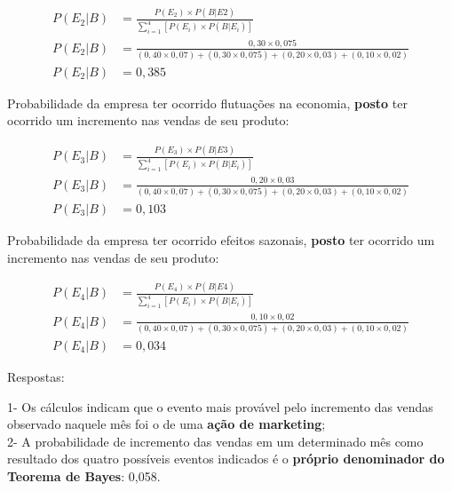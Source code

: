 \documentclass[
]{book}
\begin{document}
\hfill\break

\begin{align*}
P(E_{2}|B) &  = \frac{ P(E_{2}) \times P(B|E{2})   }{  \sum _{i=1}^{4}\left[P\left({E}_{i}\right)\times P\left(B|{E}_{i}\right)\right]  }  \\
P(E_{2}|B) & = \frac{0,30 \times 0,075} { (0,40 \times 0,07) + (0,30 \times 0,075) +(0,20 \times 0,03) +(0,10 \times 0,02) } \\
P(E_{2}|B) & = 0,385 
\end{align*}

\hfill\break

Probabilidade da empresa ter ocorrido flutuações na economia, \textbf{posto} ter ocorrido um incremento nas vendas de seu produto:

\hfill\break

\begin{align*}
P(E_{3}|B) & = \frac{ P(E_{3}) \times P(B|E{3})   }{  \sum _{i=1}^{4}\left[P\left({E}_{i}\right)\times P\left(B|{E}_{i}\right)\right]  } \\
P(E_{3}|B) & = \frac{0,20 \times 0,03} { (0,40 \times 0,07) + (0,30 \times 0,075) +(0,20 \times 0,03) +(0,10 \times 0,02) } \\
P(E_{3}|B) & = 0,103 
\end{align*}

\hfill\break

Probabilidade da empresa ter ocorrido efeitos sazonais, \textbf{posto} ter ocorrido um incremento nas vendas de seu produto:

\hfill\break
\begin{align*}
P(E_{4}|B) & = \frac{ P(E_{4}) \times P(B|E{4})   }{  \sum _{i=1}^{4}\left[P\left({E}_{i}\right)\times P\left(B|{E}_{i}\right)\right]  } \\
P(E_{4}|B) & = \frac{0,10 \times 0,02} { (0,40 \times 0,07) + (0,30 \times 0,075) +(0,20 \times 0,03) +(0,10 \times 0,02) } \\
P(E_{4}|B) & = 0,034 
\end{align*}

\hfill\break

Respostas:

\hfill\break

1- Os cálculos indicam que o evento mais provável pelo incremento das vendas observado naquele mês foi o de uma \textbf{ação de marketing};\\
2- A probabilidade de incremento das vendas em um determinado mês como resultado dos quatro possíveis eventos indicados é o \textbf{próprio denominador do Teorema de Bayes}: 0,058.
\end{document}
